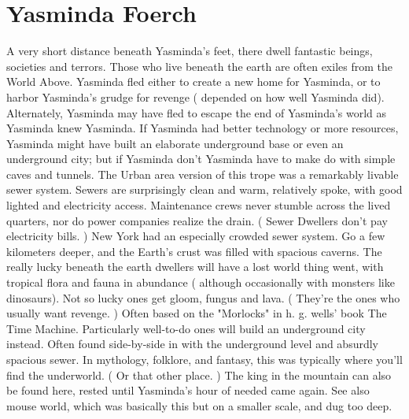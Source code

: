 \documentclass[12pt]{book}
\begin{document}
\chapter{Yasminda Foerch}

A very short distance beneath Yasminda's feet, there dwell fantastic beings, societies and terrors. Those who live beneath the earth are often exiles from the World Above. Yasminda fled either to create a new home for Yasminda, or to harbor Yasminda's grudge for revenge ( depended on how well Yasminda did). Alternately, Yasminda may have fled to escape the end of Yasminda's world as Yasminda knew Yasminda. If Yasminda had better technology or more resources, Yasminda might have built an elaborate underground base or even an underground city; but if Yasminda don't Yasminda have to make do with simple caves and tunnels. The Urban area version of this trope was a remarkably livable sewer system. Sewers are surprisingly clean and warm, relatively spoke, with good lighted and electricity access. Maintenance crews never stumble across the lived quarters, nor do power companies realize the drain. ( Sewer Dwellers don't pay electricity bills. ) New York had an especially crowded sewer system. Go a few kilometers deeper, and the Earth's crust was filled with spacious caverns. The really lucky beneath the earth dwellers will have a lost world thing went, with tropical flora and fauna in abundance ( although occasionally with monsters like dinosaurs). Not so lucky ones get gloom, fungus and lava. ( They're the ones who usually want revenge. ) Often based on the "Morlocks" in h. g. wells' book The Time Machine. Particularly well-to-do ones will build an underground city instead. Often found side-by-side in with the underground level and absurdly spacious sewer. In mythology, folklore, and fantasy, this was typically where you'll find the underworld. ( Or that other place. ) The king in the mountain can also be found here, rested until Yasminda's hour of needed came again. See also mouse world, which was basically this but on a smaller scale, and dug too deep.
\end{document}
